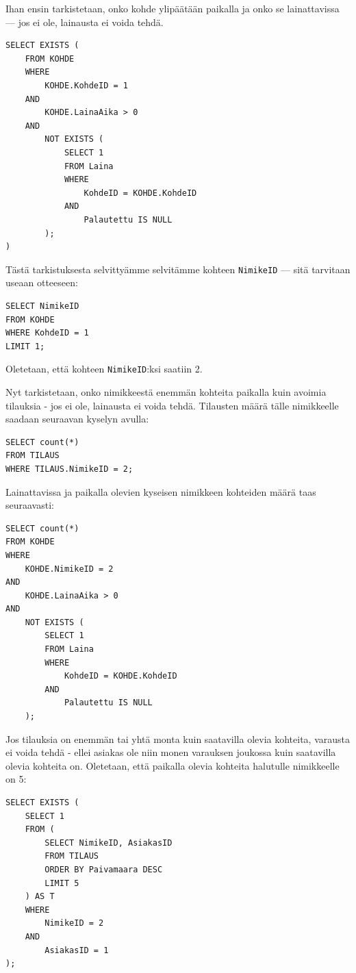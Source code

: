 \documentclass{article}
\begin{document}
Ihan ensin tarkistetaan, onko kohde ylipäätään paikalla ja onko se lainattavissa --- jos ei ole, lainausta ei voida tehdä.

\begin{lstlisting}
SELECT EXISTS (
    FROM KOHDE
    WHERE
        KOHDE.KohdeID = 1
    AND
        KOHDE.LainaAika > 0
    AND
        NOT EXISTS (
            SELECT 1
            FROM Laina
            WHERE
                KohdeID = KOHDE.KohdeID
            AND
                Palautettu IS NULL
        );
)
\end{lstlisting}

Tästä tarkistuksesta selvittyämme selvitämme kohteen \texttt{NimikeID} --- sitä tarvitaan useaan otteeseen:

\begin{lstlisting}
SELECT NimikeID
FROM KOHDE
WHERE KohdeID = 1
LIMIT 1;
\end{lstlisting}

Oletetaan, että kohteen \texttt{NimikeID}:ksi saatiin 2.

Nyt tarkistetaan, onko nimikkeestä enemmän kohteita paikalla kuin avoimia tilauksia - jos ei ole, lainausta ei voida tehdä. Tilausten määrä tälle nimikkeelle saadaan seuraavan kyselyn avulla:

\begin{lstlisting}
SELECT count(*)
FROM TILAUS
WHERE TILAUS.NimikeID = 2;
\end{lstlisting}

Lainattavissa ja paikalla olevien kyseisen nimikkeen kohteiden määrä taas seuraavasti:

\begin{lstlisting}
SELECT count(*) 
FROM KOHDE
WHERE
    KOHDE.NimikeID = 2
AND
    KOHDE.LainaAika > 0
AND
    NOT EXISTS (
        SELECT 1
        FROM Laina
        WHERE
            KohdeID = KOHDE.KohdeID
        AND
            Palautettu IS NULL
    );
\end{lstlisting}

Jos tilauksia on enemmän tai yhtä monta kuin saatavilla olevia kohteita, varausta ei voida tehdä - ellei asiakas ole niin monen varauksen joukossa kuin saatavilla olevia kohteita on. Oletetaan, että paikalla olevia kohteita halutulle nimikkeelle on 5:

\begin{lstlisting}
SELECT EXISTS (
    SELECT 1
    FROM (
        SELECT NimikeID, AsiakasID
        FROM TILAUS
        ORDER BY Paivamaara DESC
        LIMIT 5
    ) AS T
    WHERE
        NimikeID = 2
    AND
        AsiakasID = 1
);
\end{lstlisting}
\end{document}
